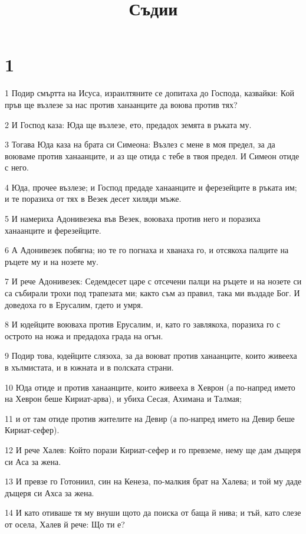 

\title{Съдии}


\chapter{1}

\par 1 Подир смъртта на Исуса, израилтяните се допитаха до Господа, казвайки: Кой пръв ще възлезе за нас против ханаанците да воюва против тях?
\par 2 И Господ каза: Юда ще възлезе, ето, предадох земята в ръката му.
\par 3 Тогава Юда каза на брата си Симеона: Възлез с мене в моя предел, за да воюваме против ханаанците, и аз ще отида с тебе в твоя предел. И Симеон отиде с него.
\par 4 Юда, прочее възлезе; и Господ предаде ханаанците и ферезейците в ръката им; и те поразиха от тях в Везек десет хиляди мъже.
\par 5 И намериха Адонивезека във Везек, воюваха против него и поразиха ханаанците и ферезейците.
\par 6 А Адонивезек побягна; но те го погнаха и хванаха го, и отсякоха палците на ръцете му и на нозете му.
\par 7 И рече Адонивезек: Седемдесет царе с отсечени палци на ръцете и на нозете си са събирали трохи под трапезата ми; както съм аз правил, така ми въздаде Бог. И доведоха го в Ерусалим, гдето и умря.
\par 8 И юдейците воюваха против Ерусалим, и, като го завлякоха, поразиха го с острото на ножа и предадоха града на огън.
\par 9 Подир това, юдейците слязоха, за да воюват против ханаанците, които живееха в хълмистата, и в южната и в полската страни.
\par 10 Юда отиде и против ханаанците, които живееха в Хеврон (а по-напред името на Хеврон беше Кириат-арва), и убиха Сесая, Ахимана и Талмая;
\par 11 и от там отиде против жителите на Девир (а по-напред името на Девир беше Кириат-сефер).
\par 12 И рече Халев: Който порази Кириат-сефер и го превземе, нему ще дам дъщеря си Аса за жена.
\par 13 И превзе го Готониил, син на Кенеза, по-малкия брат на Халева; и той му даде дъщеря си Ахса за жена.
\par 14 И като отиваше тя му внуши щото да поиска от баща й нива; и тъй, като слезе от осела, Халев й рече: Що ти е?

